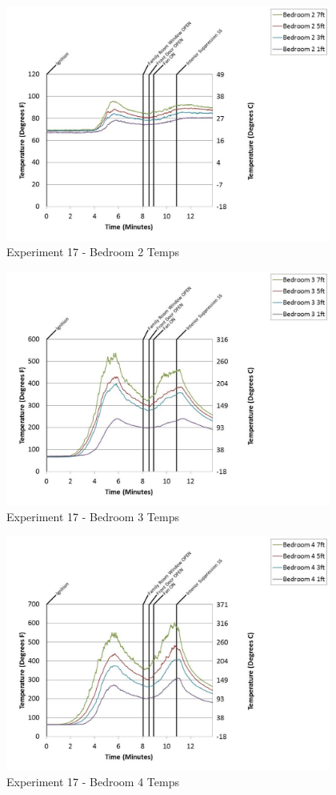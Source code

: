\documentclass{article}
\begin{document}
\begin{appendices}
	\begin{figure}[h!]
		\centering
		\includegraphics[height=3.05in]{0_Images/Results_Charts/Exp_17_Charts/Bedroom2Temps.pdf}
		\caption{Experiment 17 - Bedroom 2 Temps}
	\end{figure}
 
	\clearpage

	\begin{figure}[h!]
		\centering
		\includegraphics[height=3.05in]{0_Images/Results_Charts/Exp_17_Charts/Bedroom3Temps.pdf}
		\caption{Experiment 17 - Bedroom 3 Temps}
	\end{figure}
 

	\begin{figure}[h!]
		\centering
		\includegraphics[height=3.05in]{0_Images/Results_Charts/Exp_17_Charts/Bedroom4Temps.pdf}
		\caption{Experiment 17 - Bedroom 4 Temps}
	\end{figure}
 

\end{appendices}
\end{document}
